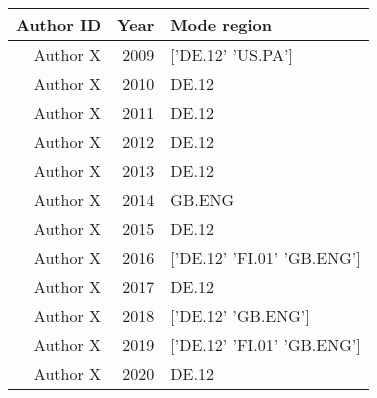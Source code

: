 \begin{tabular}{rrl}
\hline
   Author ID &   Year & Mode region                \\
\hline
 Author X &   2009 & ['DE.12' 'US.PA']          \\
 Author X &   2010 & DE.12                      \\
 Author X &   2011 & DE.12                      \\
 Author X &   2012 & DE.12                      \\
 Author X &   2013 & DE.12                      \\
 Author X &   2014 & GB.ENG                     \\
 Author X &   2015 & DE.12                      \\
 Author X &   2016 & ['DE.12' 'FI.01' 'GB.ENG'] \\
 Author X &   2017 & DE.12                      \\
 Author X &   2018 & ['DE.12' 'GB.ENG']         \\
 Author X &   2019 & ['DE.12' 'FI.01' 'GB.ENG'] \\
 Author X &   2020 & DE.12                      \\
\hline
\end{tabular}